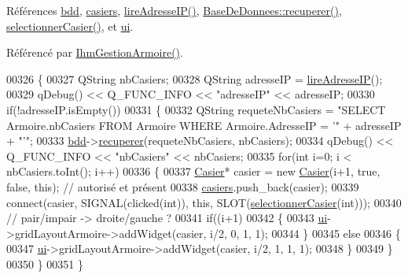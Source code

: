 Références \hyperlink{class_ihm_gestion_armoire_ad0d3a89bbcfa9f0e50ff5c50ec64d707}{bdd}, \hyperlink{class_ihm_gestion_armoire_acd01a783a46b27a1b8d1535f5ce16212}{casiers}, \hyperlink{class_ihm_gestion_armoire_a68b7ba5bc7f7475b35162b13d3b3db13}{lire\+Adresse\+I\+P()}, \hyperlink{class_base_de_donnees_a77539baad389f5acf754cd2cd452403e}{Base\+De\+Donnees\+::recuperer()}, \hyperlink{class_ihm_gestion_armoire_ac2e2365408fcbf66c0e75bb828b40162}{selectionner\+Casier()}, et \hyperlink{class_ihm_gestion_armoire_a793a2816dc21b3161566138d2af5a8b9}{ui}.



Référencé par \hyperlink{class_ihm_gestion_armoire_a7aa5e1514dd5d1b5648a2f6dd36970f9}{Ihm\+Gestion\+Armoire()}.


\begin{DoxyCode}
00326 \{
00327     QString nbCasiers;
00328     QString adresseIP = \hyperlink{class_ihm_gestion_armoire_a68b7ba5bc7f7475b35162b13d3b3db13}{lireAdresseIP}();
00329     qDebug() << Q\_FUNC\_INFO << \textcolor{stringliteral}{"adresseIP"} << adresseIP;
00330     \textcolor{keywordflow}{if}(!adresseIP.isEmpty())
00331     \{
00332         QString requeteNbCasiers = \textcolor{stringliteral}{"SELECT Armoire.nbCasiers FROM Armoire WHERE Armoire.AdresseIP = '"} + 
      adresseIP + \textcolor{stringliteral}{"'"};
00333         \hyperlink{class_ihm_gestion_armoire_ad0d3a89bbcfa9f0e50ff5c50ec64d707}{bdd}->\hyperlink{class_base_de_donnees_a77539baad389f5acf754cd2cd452403e}{recuperer}(requeteNbCasiers, nbCasiers);
00334         qDebug() << Q\_FUNC\_INFO << \textcolor{stringliteral}{"nbCasiers"} << nbCasiers;
00335         \textcolor{keywordflow}{for}(\textcolor{keywordtype}{int} i=0; i < nbCasiers.toInt(); i++)
00336         \{
00337             \hyperlink{class_casier}{Casier}* casier = \textcolor{keyword}{new} \hyperlink{class_casier}{Casier}(i+1, \textcolor{keyword}{true}, \textcolor{keyword}{false}, \textcolor{keyword}{this}); \textcolor{comment}{// autorisé et présent}
00338             \hyperlink{class_ihm_gestion_armoire_acd01a783a46b27a1b8d1535f5ce16212}{casiers}.push\_back(casier);
00339             connect(casier, SIGNAL(clicked(\textcolor{keywordtype}{int})), \textcolor{keyword}{this}, SLOT(\hyperlink{class_ihm_gestion_armoire_ac2e2365408fcbf66c0e75bb828b40162}{selectionnerCasier}(\textcolor{keywordtype}{int})));
00340             \textcolor{comment}{// pair/impair -> droite/gauche ?}
00341             \textcolor{keywordflow}{if}((i+1)%
00342             \{
00343                 \hyperlink{class_ihm_gestion_armoire_a793a2816dc21b3161566138d2af5a8b9}{ui}->gridLayoutArmoire->addWidget(casier, i/2, 0, 1, 1);
00344             \}
00345             \textcolor{keywordflow}{else}
00346             \{
00347                 \hyperlink{class_ihm_gestion_armoire_a793a2816dc21b3161566138d2af5a8b9}{ui}->gridLayoutArmoire->addWidget(casier, i/2, 1, 1, 1);
00348             \}
00349         \}
00350     \}
00351 \}
\end{DoxyCode}
